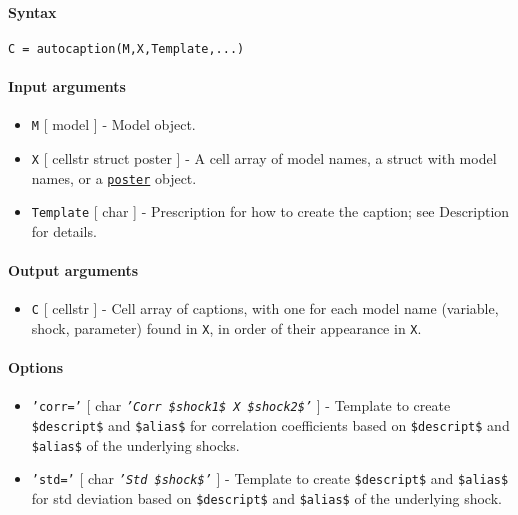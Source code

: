 


	\paragraph{Syntax}\label{syntax}

\begin{verbatim}
C = autocaption(M,X,Template,...)
\end{verbatim}

\paragraph{Input arguments}\label{input-arguments}

\begin{itemize}
\item
  \texttt{M} {[} model {]} - Model object.
\item
  \texttt{X} {[} cellstr \textbar{} struct \textbar{} poster {]} - A
  cell array of model names, a struct with model names, or a
  \href{poster/Contents}{\texttt{poster}} object.
\item
  \texttt{Template} {[} char {]} - Prescription for how to create the
  caption; see Description for details.
\end{itemize}

\paragraph{Output arguments}\label{output-arguments}

\begin{itemize}
\itemsep1pt\parskip0pt
\item
  \texttt{C} {[} cellstr {]} - Cell array of captions, with one for each
  model name (variable, shock, parameter) found in \texttt{X}, in order
  of their appearance in \texttt{X}.
\end{itemize}

\paragraph{Options}\label{options}

\begin{itemize}
\item
  \texttt{'corr='} {[} char \textbar{}
  \emph{\texttt{'Corr \$shock1\$ X \$shock2\$'}} {]} - Template to
  create \texttt{\$descript\$} and \texttt{\$alias\$} for correlation
  coefficients based on \texttt{\$descript\$} and \texttt{\$alias\$} of
  the underlying shocks.
\item
  \texttt{'std='} {[} char \textbar{} \emph{\texttt{'Std \$shock\$'}}
  {]} - Template to create \texttt{\$descript\$} and \texttt{\$alias\$}
  for std deviation based on \texttt{\$descript\$} and
  \texttt{\$alias\$} of the underlying shock.
\end{itemize}

